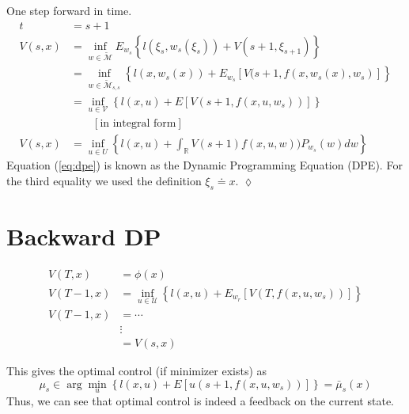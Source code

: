 \begin{example}
One step forward in time.
\begin{align}
\label{eq:dpe}
t &= s+1 \nonumber \\
V(s,x) &= \inf_{w\in\tilde{\mathcal{M}}} E_{w_s}\left\lbrace l(\xi_s,w_s(\xi_s)) + V(s+1,\xi_{s+1})\right\rbrace \nonumber \\
&= \inf_{w\in\tilde{\mathcal{M}}_{s,s}} \left\lbrace l(x,w_s(x)) + E_{w_s}[V(s+1,f(x,w_s(x),w_s)]\right\rbrace \nonumber \\
&= \inf_{u\in\mathcal{V}} \left\lbrace l(x,u) + E[V(s+1,f(x,u,w_s))]\right\rbrace \nonumber \\
&\qquad [\text{in integral form}] \nonumber \\
V(s,x) &= \inf_{u\in U} \left\lbrace l(x,u) + \int_{\mathbb{R}}V(s+1)f(x,u,w))P_{w_s}(w)dw\right\rbrace
\end{align}
Equation (\ref{eq:dpe}) is known as the Dynamic Programming Equation (DPE). For the third equality we used the definition $\xi_s \doteq x$.
$\lozenge$
\end{example}

\section{Backward DP}
\begin{align*}
V(T,x) &= \phi(x) \\
V(T-1,x) &= \inf_{u\in\mathcal{U}} \left\lbrace l(x,u) + E_{w_r}[V(T,f(x,u,w_s))]\right\rbrace \\
V(T-1,x) &= \cdots \\
&\vdots \\
&= V(s,x)
\end{align*}

This gives the optimal control (if minimizer exists) as
$$\mu_s \in \arg\min_{u} \left\lbrace l(x,u) + E[u(s+1,f(x,u,w_s))]\right\rbrace = \bar{\mu}_s(x)$$
Thus, we can see that optimal control is indeed a feedback on the current state.

